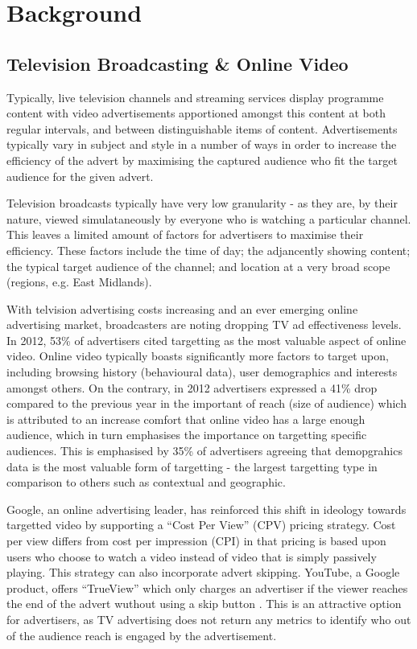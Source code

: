 \section{Background}

	\subsection{Television Broadcasting \& Online Video}

	Typically, live television channels and streaming services display programme content with video advertisements apportioned amongst this content at both regular intervals, and between distinguishable items of content. Advertisements typically vary in subject and style in a number of ways in order to increase the efficiency of the advert by maximising the captured audience who fit the target audience for the given advert.

	Television broadcasts typically have very low granularity - as they are, by their nature, viewed simulataneously by everyone who is watching a particular channel. This leaves a limited amount of factors for advertisers to maximise their efficiency. These factors include the time of day; the adjancently showing content; the typical target audience of the channel; and location at a very broad scope (regions, e.g. East Midlands).

	With telvision advertising costs increasing and an ever emerging online advertising market, broadcasters are noting dropping TV ad effectiveness levels. In 2012, 53\% of advertisers cited targetting as the most valuable aspect of online video. Online video typically boasts significantly more factors to target upon, including browsing history (behavioural data), user demographics and interests amongst others. On the contrary, in 2012 advertisers expressed a 41\% drop compared to the previous year in the important of reach (size of audience) which is attributed to an increase comfort that online video has a large enough audience, which in turn emphasises the importance on targetting specific audiences. This is emphasised by 35\% of advertisers agreeing that demopgrahics data is the most valuable form of targetting - the largest targetting type in comparison to others such as contextual and geographic. \citep{brightroll-report}


	Google, an online advertising leader, has reinforced this shift in ideology towards targetted video by supporting a ``Cost Per View'' (CPV) pricing strategy. Cost per view differs from cost per impression (CPI) in that pricing is based upon users who choose to watch a video instead of video that is simply passively playing. This strategy can also incorporate advert skipping. YouTube, a Google product, offers ``TrueView'' which only charges an advertiser if the viewer reaches the end of the advert wuthout using a skip button \citep{trueview}. This is an attractive option for advertisers, as TV advertising does not return any metrics to identify who out of the audience reach is engaged by the advertisement.


